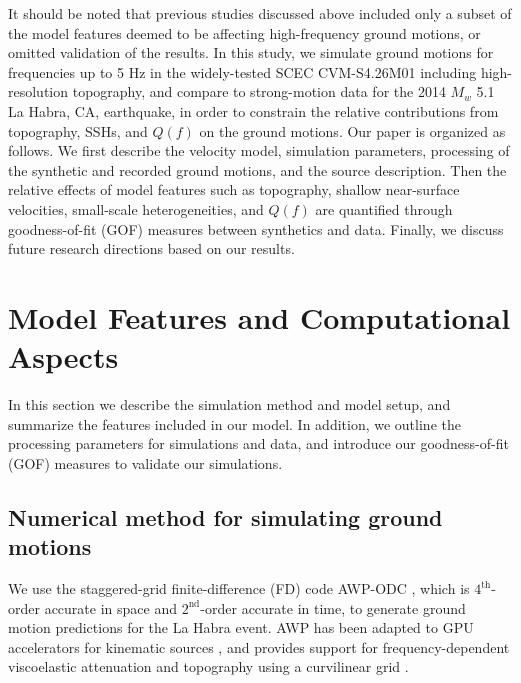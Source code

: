 It should be noted that previous studies discussed above included only a subset of the model features deemed to be affecting high-frequency ground motions, or omitted validation of the results. In this study, we simulate ground motions for frequencies up to 5 Hz in the widely-tested SCEC CVM-S4.26M01 including high-resolution topography, and compare to strong-motion data for the 2014 $M_w$ 5.1 La Habra, CA, earthquake, in order to constrain the relative contributions from topography, SSHs, and $Q(f)$ on the ground motions. Our paper is organized as follows. We first describe the velocity model, simulation parameters, processing of the synthetic and recorded ground motions, and the source description. Then the relative effects of model features such as topography, shallow near-surface velocities, small-scale heterogeneities, and $Q(f)$ are quantified through goodness-of-fit (GOF) measures between synthetics and data. Finally, we discuss future research directions based on our results.



\section{Model Features and Computational Aspects}\label{approach}

In this section we describe the simulation method and model setup, and summarize the features included in our model. In addition, we outline the processing parameters for simulations and data, and introduce our goodness-of-fit (GOF) measures to validate our simulations.

\subsection{Numerical method for simulating ground motions}
We use the staggered-grid finite-difference (FD) code AWP-ODC \citep[Anelastic Wave Propagation, Olsen-Day-Cui, from the authors of the code, hereafter denoted by AWP;][]{cuiScalableEarthquakeSimulation2010}, which is $4^{\text{th}}$-order accurate in space and $2^{\text{nd}}$-order accurate in time, to generate ground motion predictions for the La Habra event. AWP has been adapted to GPU accelerators for kinematic sources \citep{cui2013physics}, and provides support for frequency-dependent viscoelastic attenuation \citep{withersMemoryEfficientSimulation2015} and topography using a curvilinear grid \citep{oreillyHighorderFiniteDifference2021}. 

